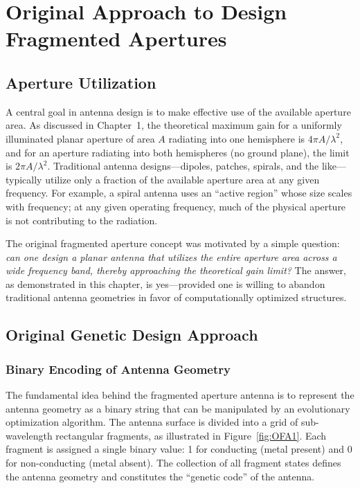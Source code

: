 \chapter{Original Approach to Design Fragmented Apertures}

\section{Aperture Utilization}

A central goal in antenna design is to make effective use of the available aperture area.  As discussed in Chapter~1, the theoretical maximum gain for a uniformly illuminated planar aperture of area $A$ radiating into one hemisphere is $4\pi A/\lambda^2$, and for an aperture radiating into both hemispheres (no ground plane), the limit is $2\pi A/\lambda^2$.  Traditional antenna designs---dipoles, patches, spirals, and the like---typically utilize only a fraction of the available aperture area at any given frequency.  For example, a spiral antenna uses an ``active region'' whose size scales with frequency; at any given operating frequency, much of the physical aperture is not contributing to the radiation.

The original fragmented aperture concept was motivated by a simple question: \emph{can one design a planar antenna that utilizes the entire aperture area across a wide frequency band, thereby approaching the theoretical gain limit?}  The answer, as demonstrated in this chapter, is yes---provided one is willing to abandon traditional antenna geometries in favor of computationally optimized structures.

\section{Original Genetic Design Approach}

\subsection{Binary Encoding of Antenna Geometry}

The fundamental idea behind the fragmented aperture antenna is to represent the antenna geometry as a binary string that can be manipulated by an evolutionary optimization algorithm.  The antenna surface is divided into a grid of sub-wavelength rectangular fragments, as illustrated in Figure~\ref{fig:OFA1}.  Each fragment is assigned a single binary value: 1 for conducting (metal present) and 0 for non-conducting (metal absent).  The collection of all fragment states defines the antenna geometry and constitutes the ``genetic code'' of the antenna.

